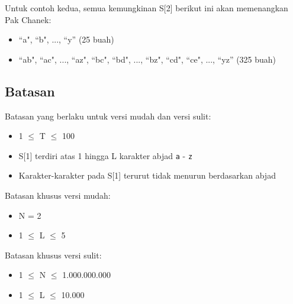 \documentclass[../main_problemset.tex]{subfiles} %
\begin{document}
Untuk contoh kedua, semua kemungkinan S[2] berikut ini akan memenangkan Pak Chanek:

\begin{itemize}
	\item ``a", ``b", ..., ``y'' (25 buah)
	\item ``ab", ``ac", ..., ``az", ``bc", ``bd", ..., ``bz", ``cd", ``ce", ..., ``yz'' (325 buah)
\end{itemize}

\subsection*{Batasan}

\begin{minipage}[t]{0.47\textwidth}
	
Batasan yang berlaku untuk versi mudah dan versi sulit:

\begin{itemize}
	\item 1 $ \leq $ T $ \leq $ 100
	\item S[1] terdiri atas 1 hingga L karakter abjad \texttt{a} - \texttt{z}
	\item Karakter-karakter pada S[1] terurut tidak menurun berdasarkan abjad
\end{itemize}
\end{minipage}
\begin{minipage}[t]{0.06\textwidth}
	\hfill
\end{minipage}
\begin{minipage}[t]{0.47\textwidth}
Batasan khusus versi mudah:
\begin{itemize}
	\item N = 2
	\item 1 $ \le $ L $ \le $ 5
\end{itemize}

\vspace{.2cm}

Batasan khusus versi sulit:
\begin{itemize}
	\item 1 $ \le $ N $ \le $ 1.000.000.000
	\item 1 $ \le $ L $ \le $ 10.000
\end{itemize}
\end{minipage}
\end{document}
